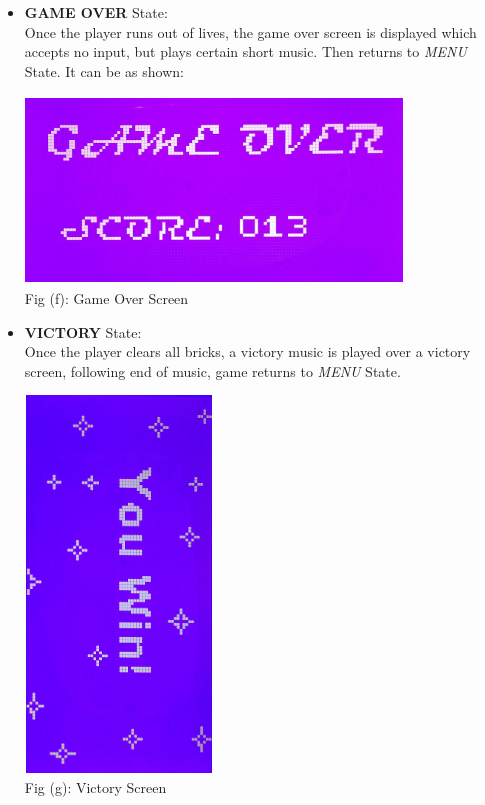 \documentclass{article}
\begin{document}
\begin{itemize}
\begin{center}
  {\small Fig (e): Gameplay Screen} \\
  \end{center}
  \item \textbf{GAME OVER} State: \\ \qquad Once the player runs out of lives, the game over screen is displayed which accepts no input, but plays certain short music. Then returns to \textit{MENU} State.
  It can be as shown:
  \begin{center}
  \includegraphics[width=10cm, height = 5cm]{Images/gameoverScreen} \\
  {\small Fig (f): Game Over Screen} \\
  \end{center}
  \item \textbf{VICTORY} State: \\ \qquad Once the player clears all bricks, a victory music is played over a victory screen, following end of music, game returns to \textit{MENU} State.
  \begin{center}
  \includegraphics[width=5cm, height=10cm, angle = 90]{Images/victoryScreen} \\
  {\small Fig (g): Victory Screen} \\
  \end{center}
\end{itemize}
\end{document}
